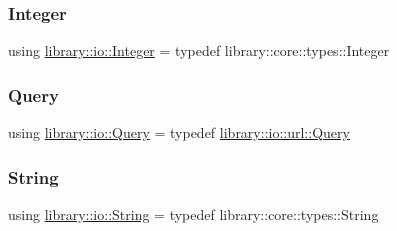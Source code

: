 \subsubsection{\texorpdfstring{Integer}{Integer}}
{\footnotesize\ttfamily using \hyperlink{namespacelibrary_1_1io_a0a929bf9e177597c2e92073d200dda53}{library\+::io\+::\+Integer} = typedef library\+::core\+::types\+::\+Integer}

\mbox{\label{namespacelibrary_1_1io_a39ebaf2265de78ba79eb5347f2af61b3}} 
\subsubsection{\texorpdfstring{Query}{Query}}
{\footnotesize\ttfamily using \hyperlink{namespacelibrary_1_1io_a39ebaf2265de78ba79eb5347f2af61b3}{library\+::io\+::\+Query} = typedef \hyperlink{classlibrary_1_1io_1_1url_1_1_query}{library\+::io\+::url\+::\+Query}}

\mbox{\label{namespacelibrary_1_1io_a7469b45835a4421045db344d6a5a1f85}} 
\subsubsection{\texorpdfstring{String}{String}}
{\footnotesize\ttfamily using \hyperlink{namespacelibrary_1_1io_a7469b45835a4421045db344d6a5a1f85}{library\+::io\+::\+String} = typedef library\+::core\+::types\+::\+String}


